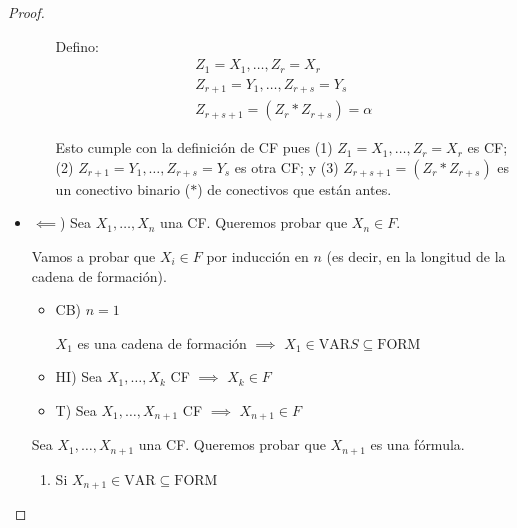 \begin{proof}
\begin{itemize}
\begin{enumerate}
                Defino: 
                \begin{gather*}
                    Z_1 = X_1, \dotsc, Z_r = X_r\\
                    Z_{r+1} = Y_1, \dotsc, Z_{r+s} = Y_s\\
                    Z_{r+s+1} = (Z_r * Z_{r+s}) = \alpha
                \end{gather*}
                
                Esto cumple con la definición de CF pues 
                (1) $Z_1 = X_1, \dotsc, Z_r = X_r$ es CF; 
                (2) $Z_{r+1} = Y_1, \dotsc, Z_{r+s} = Y_s$ es otra CF;
                y (3)
                $Z_{r+s+1} = (Z_r * Z_{r+s})$ 
                es un conectivo binario ($*$) de
                conectivos que están antes.
                
        \end{enumerate}

        \item $\impliedby$) Sea $X_1, \dotsc, X_n$ una CF.
            Queremos probar que $X_n \in F$.

            Vamos a probar que $X_i \in F$ por inducción en $n$ 
            (es decir, en la longitud de la cadena de formación).

            \begin{itemize}
                \item CB) $n=1$ 

                    $X_1$ es una cadena de formación $\implies$
                    $X_1 \in \mathrm{VAR}S \subseteq \mathrm{FORM}$

                \item HI) Sea $X_1, \dotsc, X_k$ CF
                    $\implies$ $X_k \in F$
                    
                \item T) Sea $X_1, \dotsc, X_{n+1}$ CF
                    $\implies$ $X_{n+1}\in F$
            \end{itemize}

            Sea $X_1, \dotsc, X_{n+1}$ una CF. Queremos probar que $X_{n+1}$
            es una fórmula.

            \begin{enumerate}[%
                labelindent=*,
                style=multiline,
                leftmargin=*,
                align=left,
                leftmargin=2\parindent,
                label=Caso \arabic*)]
                \item Si $X_{n+1} \in \mathrm{VAR} \subseteq \mathrm{FORM}$


\end{enumerate}
\end{itemize}
\end{proof}
